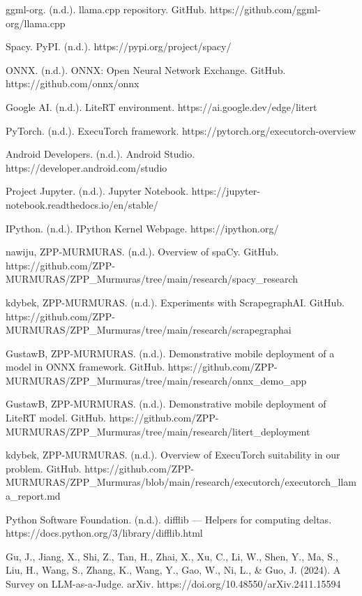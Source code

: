 \documentclass[licencjacka,en]{pracamgr}
\begin{document}
\begin{thebibliography}{99}
ggml-org. (n.d.). llama.cpp repository. GitHub. https://github.com/ggml-org/llama.cpp

Spacy. PyPI. (n.d.). https://pypi.org/project/spacy/ 

ONNX. (n.d.). ONNX: Open Neural Network Exchange. GitHub. https://github.com/onnx/onnx

Google AI. (n.d.). LiteRT environment. https://ai.google.dev/edge/litert

PyTorch. (n.d.). ExecuTorch framework. https://pytorch.org/executorch-overview

Android Developers. (n.d.). Android Studio. https://developer.android.com/studio

Project Jupyter. (n.d.). Jupyter Notebook. https://jupyter-notebook.readthedocs.io/en/stable/

IPython. (n.d.). IPython Kernel Webpage. https://ipython.org/

nawiju, ZPP-MURMURAS. (n.d.). Overview of spaCy. GitHub. https://github.com/ZPP-MURMURAS/ZPP\_Murmuras/tree/main/research/spacy\_research

kdybek, ZPP-MURMURAS. (n.d.). Experiments with ScrapegraphAI. GitHub. https://github.com/ZPP-MURMURAS/ZPP\_Murmuras/tree/main/research/scrapegraphai

GustawB, ZPP-MURMURAS. (n.d.). Demonstrative mobile deployment of a model in ONNX framework. GitHub. https://github.com/ZPP-MURMURAS/ZPP\_Murmuras/tree/main/research/onnx\_demo\_app

GustawB, ZPP-MURMURAS. (n.d.). Demonstrative mobile deployment of LiteRT model. GitHub. https://github.com/ZPP-MURMURAS/ZPP\_Murmuras/tree/main/research/litert\_deployment

kdybek, ZPP-MURMURAS. (n.d.). Overview of ExecuTorch suitability in our problem. GitHub. https://github.com/ZPP-MURMURAS/ZPP\_Murmuras/blob/main/research/executorch/executorch\_llama\_report.md

Python Software Foundation. (n.d.). difflib — Helpers for computing deltas. https://docs.python.org/3/library/difflib.html

Gu, J., Jiang, X., Shi, Z., Tan, H., Zhai, X., Xu, C., Li, W., Shen, Y., Ma, S., Liu, H., Wang, S., Zhang, K., Wang, Y., Gao, W., Ni, L., \& Guo, J. (2024). A Survey on LLM-as-a-Judge. arXiv. https://doi.org/10.48550/arXiv.2411.15594


\end{thebibliography}
\end{document}
